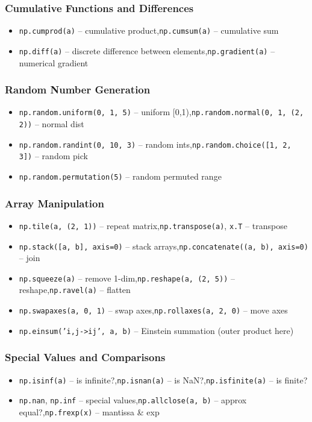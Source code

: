 \documentclass{article}
\begin{document}
\subsubsection*{Cumulative Functions and Differences}
\begin{itemize}
    \item \texttt{np.cumprod(a)} -- cumulative product,\quad \texttt{np.cumsum(a)} -- cumulative sum
    \item \texttt{np.diff(a)} -- discrete difference between elements,\quad \texttt{np.gradient(a)} -- numerical gradient
\end{itemize}

\subsubsection*{Random Number Generation}
\begin{itemize}
    \item \texttt{np.random.uniform(0, 1, 5)} -- uniform [0,1),\quad \texttt{np.random.normal(0, 1, (2, 2))} -- normal dist
    \item \texttt{np.random.randint(0, 10, 3)} -- random ints,\quad \texttt{np.random.choice([1, 2, 3])} -- random pick
    \item \texttt{np.random.permutation(5)} -- random permuted range
\end{itemize}

\subsubsection*{Array Manipulation}
\begin{itemize}
    \item \texttt{np.tile(a, (2, 1))} -- repeat matrix,\quad \texttt{np.transpose(a)}, \texttt{x.T} -- transpose
    \item \texttt{np.stack([a, b], axis=0)} -- stack arrays,\quad \texttt{np.concatenate((a, b), axis=0)} -- join
    \item \texttt{np.squeeze(a)} -- remove 1-dim,\quad \texttt{np.reshape(a, (2, 5))} -- reshape,\quad \texttt{np.ravel(a)} -- flatten
    \item \texttt{np.swapaxes(a, 0, 1)} -- swap axes,\quad \texttt{np.rollaxes(a, 2, 0)} -- move axes
    \item \texttt{np.einsum('i,j->ij', a, b)} -- Einstein summation (outer product here)
\end{itemize}

\subsubsection*{Special Values and Comparisons}
\begin{itemize}
    \item \texttt{np.isinf(a)} -- is infinite?,\quad \texttt{np.isnan(a)} -- is NaN?,\quad \texttt{np.isfinite(a)} -- is finite?
    \item \texttt{np.nan}, \texttt{np.inf} -- special values,\quad \texttt{np.allclose(a, b)} -- approx equal?,\quad \texttt{np.frexp(x)} -- mantissa \& exp
\end{itemize}
\end{document}
